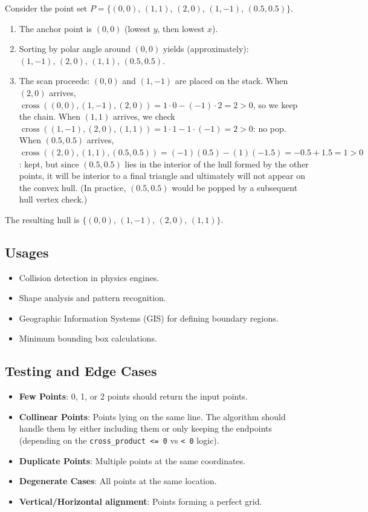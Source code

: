 \begin{example}\label{ex:graham_trace}
Consider the point set $P = \{(0,0),\, (1,1),\, (2,0),\, (1,-1),\, (0.5, 0.5)\}$.
\begin{enumerate}
\item The anchor point is $(0,0)$ (lowest $y$, then lowest $x$).
\item Sorting by polar angle around $(0,0)$ yields (approximately): $(1,-1),\, (2,0),\, (1,1),\, (0.5, 0.5)$.
\item The scan proceeds: $(0,0)$ and $(1,-1)$ are placed on the stack. When $(2,0)$ arrives, $\operatorname{cross}((0,0),(1,-1),(2,0)) = 1 \cdot 0 - (-1) \cdot 2 = 2 > 0$, so we keep the chain. When $(1,1)$ arrives, we check $\operatorname{cross}((1,-1),(2,0),(1,1)) = 1 \cdot 1 - 1 \cdot (-1) = 2 > 0$: no pop. When $(0.5, 0.5)$ arrives, $\operatorname{cross}((2,0),(1,1),(0.5,0.5)) = (-1)(0.5) - (1)(-1.5) = -0.5 + 1.5 = 1 > 0$: kept, but since $(0.5,0.5)$ lies in the interior of the hull formed by the other points, it will be interior to a final triangle and ultimately will not appear on the convex hull. (In practice, $(0.5,0.5)$ would be popped by a subsequent hull vertex check.)
\end{enumerate}
The resulting hull is $\{(0,0),\, (1,-1),\, (2,0),\, (1,1)\}$.
\end{example}

\subsection{Usages}

\begin{itemize}
\item Collision detection in physics engines.
\item Shape analysis and pattern recognition.
\item Geographic Information Systems (GIS) for defining boundary regions.
\item Minimum bounding box calculations.
\end{itemize}

\subsection{Testing and Edge Cases}

\begin{itemize}
\item \textbf{Few Points}: 0, 1, or 2 points should return the input points.
\item \textbf{Collinear Points}: Points lying on the same line. The algorithm should handle them by either including them or only keeping the endpoints (depending on the \texttt{cross\_product <= 0} vs \texttt{< 0} logic).
\item \textbf{Duplicate Points}: Multiple points at the same coordinates.
\item \textbf{Degenerate Cases}: All points at the same location.
\item \textbf{Vertical/Horizontal alignment}: Points forming a perfect grid.
\end{itemize}

